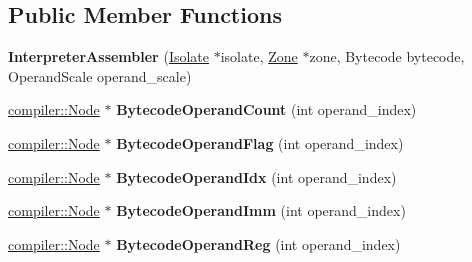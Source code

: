 \subsection*{Public Member Functions}
\begin{DoxyCompactItemize}
\item 
{\bfseries Interpreter\+Assembler} (\hyperlink{classv8_1_1internal_1_1_isolate}{Isolate} $\ast$isolate, \hyperlink{classv8_1_1internal_1_1_zone}{Zone} $\ast$zone, Bytecode bytecode, Operand\+Scale operand\+\_\+scale)\hypertarget{classv8_1_1internal_1_1interpreter_1_1_interpreter_assembler_af2979dba5bfeabc73fd7cf994d5c7c59}{}\label{classv8_1_1internal_1_1interpreter_1_1_interpreter_assembler_af2979dba5bfeabc73fd7cf994d5c7c59}

\item 
\hyperlink{classv8_1_1internal_1_1compiler_1_1_node}{compiler\+::\+Node} $\ast$ {\bfseries Bytecode\+Operand\+Count} (int operand\+\_\+index)\hypertarget{classv8_1_1internal_1_1interpreter_1_1_interpreter_assembler_a7ec14f6c782193ab496ef98c678f6132}{}\label{classv8_1_1internal_1_1interpreter_1_1_interpreter_assembler_a7ec14f6c782193ab496ef98c678f6132}

\item 
\hyperlink{classv8_1_1internal_1_1compiler_1_1_node}{compiler\+::\+Node} $\ast$ {\bfseries Bytecode\+Operand\+Flag} (int operand\+\_\+index)\hypertarget{classv8_1_1internal_1_1interpreter_1_1_interpreter_assembler_a72a05de733b499db6c6904258eb495ff}{}\label{classv8_1_1internal_1_1interpreter_1_1_interpreter_assembler_a72a05de733b499db6c6904258eb495ff}

\item 
\hyperlink{classv8_1_1internal_1_1compiler_1_1_node}{compiler\+::\+Node} $\ast$ {\bfseries Bytecode\+Operand\+Idx} (int operand\+\_\+index)\hypertarget{classv8_1_1internal_1_1interpreter_1_1_interpreter_assembler_afe09cd80f62d8e9174eedbad83f97a00}{}\label{classv8_1_1internal_1_1interpreter_1_1_interpreter_assembler_afe09cd80f62d8e9174eedbad83f97a00}

\item 
\hyperlink{classv8_1_1internal_1_1compiler_1_1_node}{compiler\+::\+Node} $\ast$ {\bfseries Bytecode\+Operand\+Imm} (int operand\+\_\+index)\hypertarget{classv8_1_1internal_1_1interpreter_1_1_interpreter_assembler_ac47625a71637ae7224ac72db3c156f3b}{}\label{classv8_1_1internal_1_1interpreter_1_1_interpreter_assembler_ac47625a71637ae7224ac72db3c156f3b}

\item 
\hyperlink{classv8_1_1internal_1_1compiler_1_1_node}{compiler\+::\+Node} $\ast$ {\bfseries Bytecode\+Operand\+Reg} (int operand\+\_\+index)\hypertarget{classv8_1_1internal_1_1interpreter_1_1_interpreter_assembler_aef659fd3b1ddcd12546298df8424a55b}{}\label{classv8_1_1internal_1_1interpreter_1_1_interpreter_assembler_aef659fd3b1ddcd12546298df8424a55b}


\end{DoxyCompactItemize}
